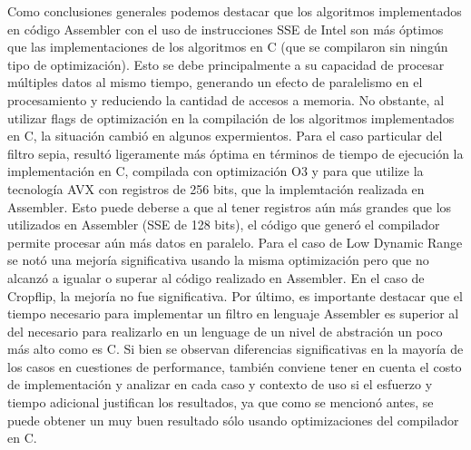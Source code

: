 \documentclass[a4paper]{article}
\begin{document}
Como conclusiones generales podemos destacar que los algoritmos implementados
en código Assembler con el uso de instrucciones SSE de Intel son más óptimos que
las implementaciones de los algoritmos en C (que se compilaron sin ningún 
tipo de optimización). Esto se debe principalmente a
su capacidad de procesar múltiples datos al mismo tiempo, generando un efecto
de paralelismo en el procesamiento y reduciendo la cantidad de accesos a memoria.
No obstante, al utilizar flags de optimización en la compilación de los algoritmos
implementados en C, la situación cambió en algunos expermientos. Para el caso particular del filtro sepia, resultó ligeramente más óptima en términos de tiempo de ejecución
la implementación en C, compilada con optimización O3 y para que utilize la tecnología AVX con registros de 256 bits, que la implemtación realizada en Assembler. Esto puede deberse a que al tener registros aún más grandes que los utilizados en Assembler (SSE de 128 bits), el código que generó el compilador permite procesar aún más datos en paralelo. 
Para el caso de Low Dynamic Range se notó una mejoría significativa usando la misma optimización pero que no alcanzó a igualar o superar al código realizado en Assembler. En el caso de Cropflip, la mejoría no fue significativa.
Por último, es importante destacar que el tiempo necesario para implementar un filtro en lenguaje Assembler es superior al del necesario para realizarlo en un lenguage de un nivel de abstración un poco más alto como es C. Si bien se observan diferencias significativas en la mayoría de los casos en cuestiones de performance, también conviene tener en cuenta el costo de implementación y analizar en cada caso y contexto de uso si el esfuerzo y tiempo adicional justifican los resultados, ya que como se mencionó antes, se puede obtener un muy buen resultado sólo usando optimizaciones del compilador en C.   
\end{document}

